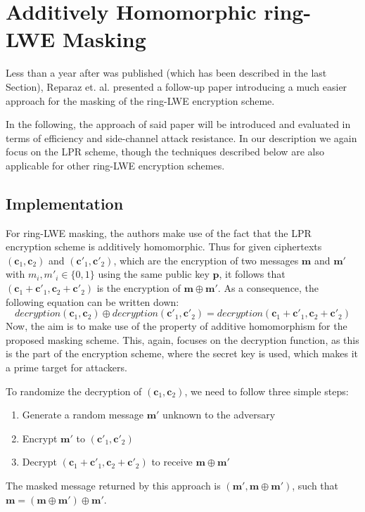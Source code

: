 \chapter{Additively Homomorphic ring-LWE Masking}
Less than a year after\cite{maskedRing} was published (which has been described in the last Section), Reparaz et. al. presented a follow-up paper \cite{Reparaz2016} introducing a much easier approach for the masking of the \ac{ring-LWE} encryption scheme.

In the following, the approach of said paper will be introduced and evaluated in terms of efficiency and side-channel attack resistance. In our description we again focus on the \ac{LPR} scheme, though the techniques described below are also applicable for other \ac{ring-LWE} encryption schemes.

\section{Implementation}
For \ac{ring-LWE} masking, the authors make use of the fact that the \ac{LPR} encryption scheme is additively homomorphic. Thus for given ciphertexts \((\textbf{c}_1, \textbf{c}_2)\) and \((\textbf{c}'_1, \textbf{c}'_2)\), which are the encryption of two messages \(\textbf{m}\) and \(\textbf{m}'\) with \(m_i, m'_i \in \{0,1\}\) using the same public key \(\textbf{p}\), it follows that \((\textbf{c}_1+\textbf{c}'_1, \textbf{c}_2+\textbf{c}'_2)\) is the encryption of \(\textbf{m} \oplus \textbf{m}'\). As a consequence, the following equation can be written down:
\begin{equation}
	decryption(\textbf{c}_1,\textbf{c}_2) \oplus decryption(\textbf{c}'_1,\textbf{c}'_2) = decryption(\textbf{c}_1 + \textbf{c}'_1,\textbf{c}_2 + \textbf{c}'_2)
\end{equation}
Now, the aim is to make use of the property of additive homomorphism for the proposed masking scheme. This, again, focuses on the decryption function, as this is the part of the encryption scheme, where the secret key is used, which makes it a prime target for attackers.

To randomize the decryption of \((\textbf{c}_1, \textbf{c}_2)\), we need to follow three simple steps:
\begin{enumerate}
\item Generate a random message \(\textbf{m}'\) unknown to the adversary
\item Encrypt \(\textbf{m}'\) to \((\textbf{c}'_1, \textbf{c}'_2)\)
\item Decrypt \((\textbf{c}_1+\textbf{c}'_1, \textbf{c}_2+\textbf{c}'_2)\) to receive \(\textbf{m} \oplus \textbf{m}'\)
\end{enumerate}
The masked message returned by this approach is \((\textbf{m}', \textbf{m} \oplus \textbf{m}')\), such that \(\textbf{m} = (\textbf{m} \oplus \textbf{m}') \oplus \textbf{m}'\).

